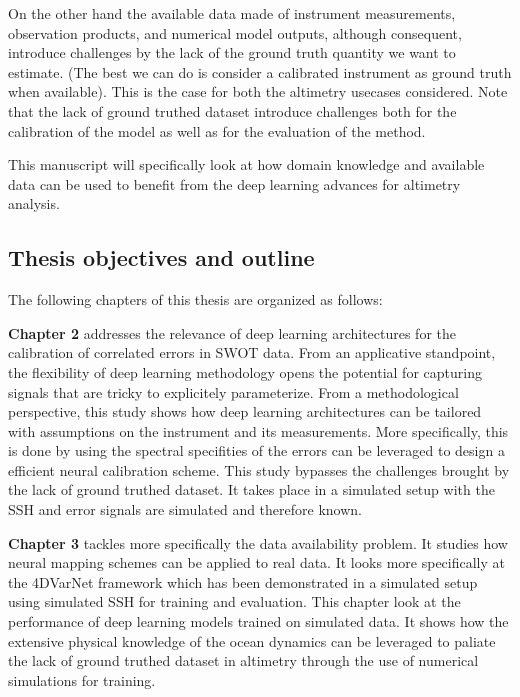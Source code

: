 \begin{bibunit}
On the other hand the available data made of instrument measurements, observation products, and numerical model outputs, although consequent, introduce challenges by the lack of the ground truth quantity we want to estimate. (The best we can do is consider a calibrated instrument as ground truth when available). This is the case for both the altimetry usecases considered.
Note that the lack of ground truthed dataset introduce challenges both for the calibration of the model as well as for the evaluation of the method.


This manuscript will specifically look at how domain knowledge and available data can be used to benefit from the deep learning advances for altimetry analysis.



\subsection{Thesis objectives and outline}

The following chapters of this thesis are organized as follows:

\textbf{Chapter 2} addresses the relevance of deep learning architectures for the calibration of correlated errors in SWOT data.
From an applicative standpoint, the flexibility of deep learning methodology opens the potential for capturing signals that are tricky to explicitely parameterize.
From a methodological perspective, this study shows how deep learning architectures can be tailored with assumptions on the instrument and its measurements.
More specifically, this is done by using the spectral specifities of the errors can be leveraged to design a efficient neural calibration scheme.
This study bypasses the challenges brought by the lack of ground truthed dataset.
It takes place in a simulated setup with the SSH and error signals are simulated and therefore known.


\textbf{Chapter 3} tackles more specifically the data availability problem. It studies how neural mapping schemes can be applied to real data.
It looks more specifically at the 4DVarNet\cite{} framework which has been demonstrated in a simulated setup\cite{} using simulated SSH for training and evaluation.
This chapter look at the performance of deep learning models trained on simulated data.
It shows how the extensive physical knowledge of the ocean dynamics can be leveraged to paliate the lack of ground truthed dataset in altimetry through the use  of numerical simulations for training.


\end{bibunit}
